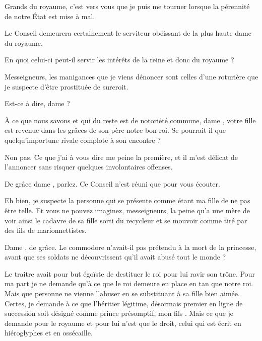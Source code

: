\scene

\StageDirII{\reine, \nobleOne, \nobleTwo, \nobleTree}


\begin{drama}
  \reinespeaks Grands du royaume, c’est vers vous que je puis me tourner lorsque la pérennité de notre État est mise à mal. 

  \nobleOnespeaks Le Conseil demeurera certainement le serviteur obéissant de la plus haute dame du royaume.

  \nobleTwospeaks En quoi celui-ci peut-il servir les intérêts de la reine et donc du royaume ?

  \reinespeaks Messeigneurs, les manigances que je viens dénoncer sont celles d’une roturière  que je suspecte d’être prostituée de surcroit.

  \nobleOnespeaks Est-ce à dire, dame \reine ?

  \nobleTreespeaks À ce que nous savons et qui du reste est de notoriété commune, dame \princesse, votre fille est revenue dans les grâces de son père notre bon roi. Se pourrait-il que quelqu’importune rivale complote à son encontre ?

  \reinespeaks Non pas. Ce que j’ai à vous dire me peine la première, et il m’est délicat de l’annoncer sans risquer quelques involontaires offenses.

  \nobleOnespeaks De grâce dame \reine, parlez. Ce Conseil n’est réuni que pour vous écouter.

  \reinespeaks Eh bien, je suspecte la personne qui se présente comme étant ma fille \princesse{} de ne pas être telle. Et vous ne pouvez imaginez, messeigneurs, la peine qu’a une mère de voir ainsi le cadavre de sa fille sorti du recycleur et se mouvoir comme tiré par des fils de marionnettistes. 


  \nobleOnespeaks Dame \reine, de grâce. Le commodore \general{}  n’avait-il pas prétendu à la mort de la princesse, avant que ses soldats ne découvrissent qu’il avait abusé tout le monde ?

  \reinespeaks Le traitre avait pour but égoïste de destituer le roi pour lui ravir son trône. Pour ma part je ne demande qu’à ce que le roi demeure en place en tan que notre roi. Mais que personne ne vienne l’abuser en se substituant à sa fille bien aimée. Certes, je demande à ce que l’héritier légitime, désormais premier en ligne de succession soit désigné comme prince présomptif, mon fils \vladimir{}. Mais ce que je demande pour le royaume et pour lui n’est que le droit, celui qui est écrit en hiéroglyphes et en ossécaille.


\end{drama}
